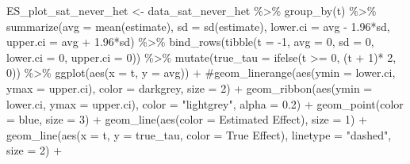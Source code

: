 \documentclass[
  letterpaper,
  DIV=11,
  numbers=noendperiod]{scrartcl}
\newenvironment{Shaded}{\begin{snugshade}}{\end{snugshade}}
\newcommand{\AttributeTok}[1]{\textcolor[rgb]{0.40,0.45,0.13}{#1}}
\newcommand{\CommentTok}[1]{\textcolor[rgb]{0.37,0.37,0.37}{#1}}
\newcommand{\DecValTok}[1]{\textcolor[rgb]{0.68,0.00,0.00}{#1}}
\newcommand{\FloatTok}[1]{\textcolor[rgb]{0.68,0.00,0.00}{#1}}
\newcommand{\FunctionTok}[1]{\textcolor[rgb]{0.28,0.35,0.67}{#1}}
\newcommand{\NormalTok}[1]{\textcolor[rgb]{0.00,0.23,0.31}{#1}}
\newcommand{\OtherTok}[1]{\textcolor[rgb]{0.00,0.23,0.31}{#1}}
\newcommand{\SpecialCharTok}[1]{\textcolor[rgb]{0.37,0.37,0.37}{#1}}
\newcommand{\StringTok}[1]{\textcolor[rgb]{0.13,0.47,0.30}{#1}}
\begin{document}
\begin{Shaded}
\begin{Highlighting}[]
\NormalTok{ES\_plot\_sat\_never\_het }\OtherTok{\textless{}{-}}\NormalTok{ data\_sat\_never\_het }\SpecialCharTok{\%\textgreater{}\%} 
  \FunctionTok{group\_by}\NormalTok{(t) }\SpecialCharTok{\%\textgreater{}\%} 
  \FunctionTok{summarize}\NormalTok{(}\AttributeTok{avg =} \FunctionTok{mean}\NormalTok{(estimate),}
            \AttributeTok{sd =} \FunctionTok{sd}\NormalTok{(estimate),}
            \AttributeTok{lower.ci =}\NormalTok{ avg }\SpecialCharTok{{-}} \FloatTok{1.96}\SpecialCharTok{*}\NormalTok{sd,}
            \AttributeTok{upper.ci =}\NormalTok{ avg }\SpecialCharTok{+} \FloatTok{1.96}\SpecialCharTok{*}\NormalTok{sd) }\SpecialCharTok{\%\textgreater{}\%} 
  \FunctionTok{bind\_rows}\NormalTok{(}\FunctionTok{tibble}\NormalTok{(}\AttributeTok{t =} \SpecialCharTok{{-}}\DecValTok{1}\NormalTok{, }\AttributeTok{avg =} \DecValTok{0}\NormalTok{, }\AttributeTok{sd =} \DecValTok{0}\NormalTok{, }\AttributeTok{lower.ci =} \DecValTok{0}\NormalTok{, }\AttributeTok{upper.ci =} \DecValTok{0}\NormalTok{)) }\SpecialCharTok{\%\textgreater{}\%} 
  \FunctionTok{mutate}\NormalTok{(}\AttributeTok{true\_tau =} \FunctionTok{ifelse}\NormalTok{(t }\SpecialCharTok{\textgreater{}=} \DecValTok{0}\NormalTok{, (t }\SpecialCharTok{+} \DecValTok{1}\NormalTok{)}\SpecialCharTok{*} \DecValTok{2}\NormalTok{, }\DecValTok{0}\NormalTok{)) }\SpecialCharTok{\%\textgreater{}\%} 
  \FunctionTok{ggplot}\NormalTok{(}\FunctionTok{aes}\NormalTok{(}\AttributeTok{x =}\NormalTok{ t, }\AttributeTok{y =}\NormalTok{ avg)) }\SpecialCharTok{+} 
  \CommentTok{\#geom\_linerange(aes(ymin = lower.ci, ymax = upper.ci), color = \textquotesingle{}darkgrey\textquotesingle{}, size = 2) + }
  \FunctionTok{geom\_ribbon}\NormalTok{(}\FunctionTok{aes}\NormalTok{(}\AttributeTok{ymin =}\NormalTok{ lower.ci, }\AttributeTok{ymax =}\NormalTok{ upper.ci), }\AttributeTok{color =} \StringTok{"lightgrey"}\NormalTok{, }\AttributeTok{alpha =} \FloatTok{0.2}\NormalTok{) }\SpecialCharTok{+}
  \FunctionTok{geom\_point}\NormalTok{(}\AttributeTok{color =} \StringTok{\textquotesingle{}blue\textquotesingle{}}\NormalTok{, }\AttributeTok{size =} \DecValTok{3}\NormalTok{) }\SpecialCharTok{+} 
   \FunctionTok{geom\_line}\NormalTok{(}\FunctionTok{aes}\NormalTok{(}\AttributeTok{color =} \StringTok{\textquotesingle{}Estimated Effect\textquotesingle{}}\NormalTok{), }\AttributeTok{size =} \DecValTok{1}\NormalTok{) }\SpecialCharTok{+} 
   \FunctionTok{geom\_line}\NormalTok{(}\FunctionTok{aes}\NormalTok{(}\AttributeTok{x =}\NormalTok{ t, }\AttributeTok{y =}\NormalTok{ true\_tau, }\AttributeTok{color =} \StringTok{\textquotesingle{}True Effect\textquotesingle{}}\NormalTok{), }\AttributeTok{linetype =} \StringTok{"dashed"}\NormalTok{, }\AttributeTok{size =} \DecValTok{2}\NormalTok{) }\SpecialCharTok{+} 

\end{Highlighting}
\end{Shaded}
\end{document}
